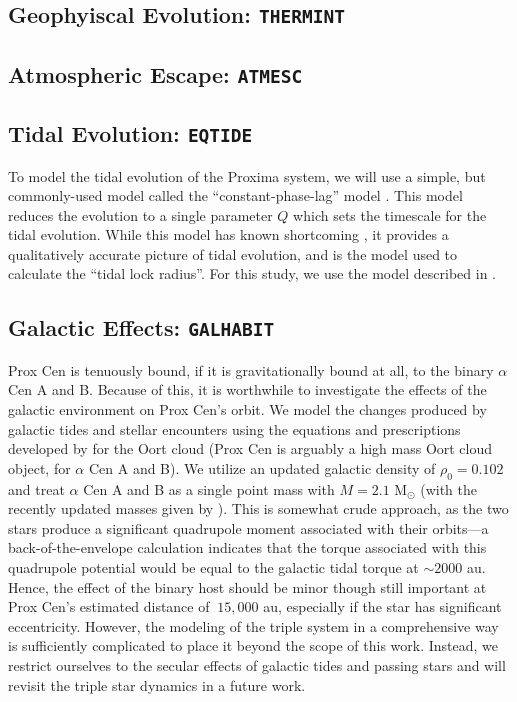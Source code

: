 \documentclass[preprint,12pt]{aastex}
\def\atmesc{\texttt{\footnotesize{ATMESC}}}
\def\eqtide{\texttt{\footnotesize{EQTIDE}}}
\def\thermint{\texttt{\footnotesize{THERMINT}}}
\def\galhabit{\texttt{\footnotesize{GALHABIT}}}
\begin{document}
\subsection{Geophyiscal Evolution: \thermint}

\subsection{Atmospheric Escape: \atmesc}

\subsection{Tidal Evolution: \eqtide}
To model the tidal evolution of the Proxima system, we will use a
simple, but commonly-used model called the ``constant-phase-lag''
model \citep{Goldreich66,Greenberg09,Heller11}. This model reduces the
evolution to a single parameter $Q$ which sets the timescale for the
tidal evolution. While this model has known shortcoming
\citep{TuomaWisdom94,EfroimskyMakarov13}, it provides a qualitatively
accurate picture of tidal evolution, and is the model \cite{Kasting93}
used to calculate the ``tidal lock radius''. For this study, we use
the model described in \citep{Heller11}.

\subsection{Galactic Effects: \galhabit}
Prox Cen is tenuously bound, if it is gravitationally bound at all, to the binary $\alpha$ Cen A and B. Because of this, it is worthwhile to investigate the effects of the galactic environment on Prox Cen's orbit. We model the changes produced by galactic tides and stellar encounters using the equations and prescriptions developed by \cite{Heisler1986, Heisler1987} for the Oort cloud (Prox Cen is arguably a high mass Oort cloud object, for $\alpha$ Cen A and B). We utilize an updated galactic density of $\rho_0 = 0.102$ \citep{Holmberg2000} and treat $\alpha$ Cen A and B as a single point mass with $M = 2.1$ M$_{\odot}$ (with the recently updated masses given by \cite{PourbaixBoffin16}). This is somewhat crude approach, as the two stars produce a significant quadrupole moment associated with their orbits---a back-of-the-envelope calculation indicates that the torque associated with this quadrupole potential would be equal to the galactic tidal torque at $\sim 2000$ au. Hence, the effect of the binary host should be minor though still important at Prox Cen's estimated distance of $~15,000$ au, especially if the star has significant eccentricity. However, the modeling of the triple system in a comprehensive way is sufficiently complicated \citep[see, i.e.][]{Harrington1968, Ford2000} to place it beyond the scope of this work. Instead, we restrict ourselves to the secular effects of galactic tides and passing stars and will revisit the triple star dynamics in a future work. 
\end{document}
